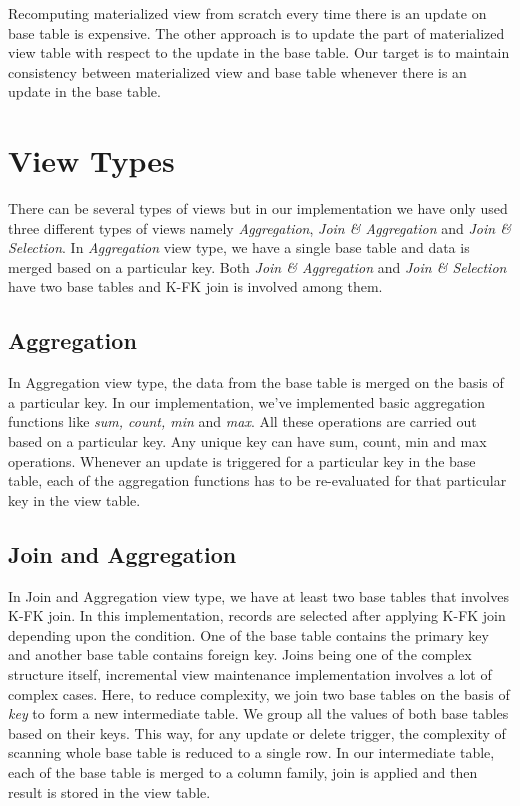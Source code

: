 \documentclass[11pt,a4paper,bibtotoc,idxtotoc,headsepline,footsepline,footexclude,BCOR12mm,DIV13]{scrbook}
\begin{document}
Recomputing materialized view from scratch every time there is an update on base table is expensive. The other approach is to update the part of materialized view table with respect to the update in the base table. Our target is to maintain consistency between materialized view and base table whenever there is an update in the base table.

\section{View Types}
\label{View Types}
There can be several types of views but in our implementation we have only used three different types of views namely \emph{Aggregation}, \emph{Join \& Aggregation} and \emph{Join \& Selection}. In \emph{Aggregation} view type, we have a single base table and data is merged based on a particular key. Both  \emph{Join \& Aggregation} and \emph{Join \& Selection} have two base tables and K-FK join is involved among them. 

\subsection{Aggregation}
In Aggregation view type, the data from the base table is merged on the basis of a particular key. In our implementation, we've implemented basic aggregation functions like \emph{sum, count, min} and \emph{max}. All these operations are carried out based on a particular key. Any unique key can have sum, count, min and max operations. Whenever an update is triggered for a particular key in the base table, each of the aggregation functions has to be re-evaluated for that particular key in the view table.


\subsection{Join and Aggregation}
In Join and Aggregation view type, we have at least two base tables that involves K-FK join. In this implementation, records are selected after applying K-FK join depending upon the condition. One of the base table contains the primary key and another base table contains foreign key. Joins being one of the complex structure itself, incremental view maintenance implementation involves a lot of complex cases. Here, to reduce complexity, we join two base tables on the basis of \emph{key} to form a new intermediate table. We group all the values of both base tables based on their keys. This way, for any update or delete trigger, the complexity of scanning whole base table is reduced to a single row. In our intermediate table, each of the base table is merged to a column family, join is applied and then result is stored in the view table. 
\end{document}
